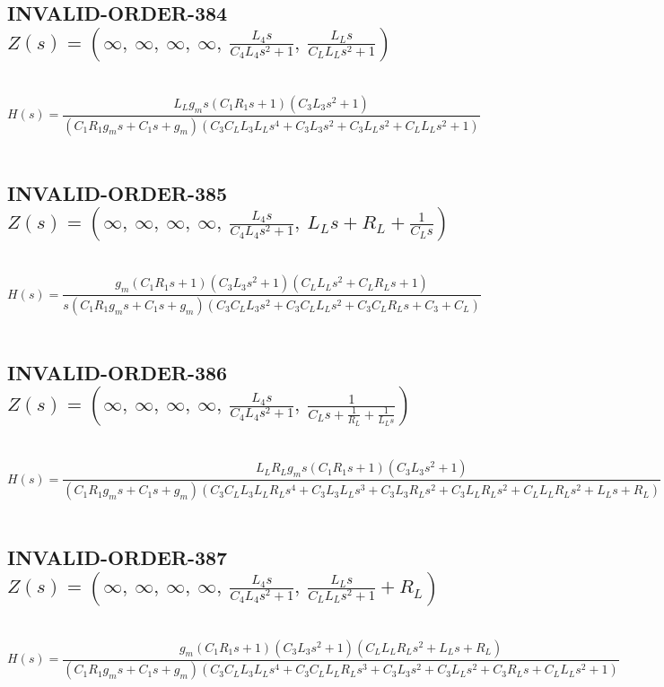\documentclass{article}
\begin{document}
\subsection{INVALID-ORDER-384 $Z(s) = \left( \infty, \  \infty, \  \infty, \  \infty, \  \frac{L_{4} s}{C_{4} L_{4} s^{2} + 1}, \  \frac{L_{L} s}{C_{L} L_{L} s^{2} + 1}\right)$ } \ 
\textbf{\[H(s) = \frac{L_{L} g_{m} s \left(C_{1} R_{1} s + 1\right) \left(C_{3} L_{3} s^{2} + 1\right)}{\left(C_{1} R_{1} g_{m} s + C_{1} s + g_{m}\right) \left(C_{3} C_{L} L_{3} L_{L} s^{4} + C_{3} L_{3} s^{2} + C_{3} L_{L} s^{2} + C_{L} L_{L} s^{2} + 1\right)}\] } \ 
\subsection{INVALID-ORDER-385 $Z(s) = \left( \infty, \  \infty, \  \infty, \  \infty, \  \frac{L_{4} s}{C_{4} L_{4} s^{2} + 1}, \  L_{L} s + R_{L} + \frac{1}{C_{L} s}\right)$ } \ 
\textbf{\[H(s) = \frac{g_{m} \left(C_{1} R_{1} s + 1\right) \left(C_{3} L_{3} s^{2} + 1\right) \left(C_{L} L_{L} s^{2} + C_{L} R_{L} s + 1\right)}{s \left(C_{1} R_{1} g_{m} s + C_{1} s + g_{m}\right) \left(C_{3} C_{L} L_{3} s^{2} + C_{3} C_{L} L_{L} s^{2} + C_{3} C_{L} R_{L} s + C_{3} + C_{L}\right)}\] } \ 
\subsection{INVALID-ORDER-386 $Z(s) = \left( \infty, \  \infty, \  \infty, \  \infty, \  \frac{L_{4} s}{C_{4} L_{4} s^{2} + 1}, \  \frac{1}{C_{L} s + \frac{1}{R_{L}} + \frac{1}{L_{L} s}}\right)$ } \ 
\textbf{\[H(s) = \frac{L_{L} R_{L} g_{m} s \left(C_{1} R_{1} s + 1\right) \left(C_{3} L_{3} s^{2} + 1\right)}{\left(C_{1} R_{1} g_{m} s + C_{1} s + g_{m}\right) \left(C_{3} C_{L} L_{3} L_{L} R_{L} s^{4} + C_{3} L_{3} L_{L} s^{3} + C_{3} L_{3} R_{L} s^{2} + C_{3} L_{L} R_{L} s^{2} + C_{L} L_{L} R_{L} s^{2} + L_{L} s + R_{L}\right)}\] } \ 
\subsection{INVALID-ORDER-387 $Z(s) = \left( \infty, \  \infty, \  \infty, \  \infty, \  \frac{L_{4} s}{C_{4} L_{4} s^{2} + 1}, \  \frac{L_{L} s}{C_{L} L_{L} s^{2} + 1} + R_{L}\right)$ } \ 
\textbf{\[H(s) = \frac{g_{m} \left(C_{1} R_{1} s + 1\right) \left(C_{3} L_{3} s^{2} + 1\right) \left(C_{L} L_{L} R_{L} s^{2} + L_{L} s + R_{L}\right)}{\left(C_{1} R_{1} g_{m} s + C_{1} s + g_{m}\right) \left(C_{3} C_{L} L_{3} L_{L} s^{4} + C_{3} C_{L} L_{L} R_{L} s^{3} + C_{3} L_{3} s^{2} + C_{3} L_{L} s^{2} + C_{3} R_{L} s + C_{L} L_{L} s^{2} + 1\right)}\] } \ 
\end{document}
